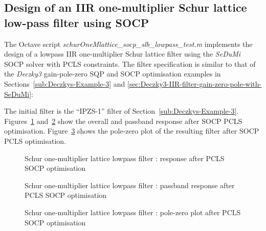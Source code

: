 \documentclass[a4paper,twoside,10pt,english]{report}
\begin{document}
\subsection{Design of an IIR one-multiplier Schur lattice low-pass filter using SOCP}
The Octave script \emph{schurOneMlattice\_socp\_slb\_lowpass\_test.m} implements
the design of a lowpass IIR one-multiplier Schur lattice filter using the 
\emph{SeDuMi} SOCP solver with PCLS constraints. The filter specification is 
similar to that of the \emph{Deczky3} gain-pole-zero SQP and SOCP optimisation
examples in Sections~\ref{sub:Deczkys-Example-3} and
\ref{sec:Deczky3-IIR-filter-gain-zero-pole-with-SeDuMi}:
\begin{small}

\end{small}
The initial filter is the ``IPZS-1'' filter of 
Section~\ref{sub:Deczkys-Example-3}. 
Figures~\ref{fig:Schur-one-multiplier-lattice-lowpass-filter-SOCP-PCLS} 
and~\ref{fig:Schur-one-multiplier-lattice-lowpass-filter-SOCP-PCLS-pass} 
show the overall and passband response after SOCP PCLS optimisation.
Figure~\ref{fig:Schur-one-multiplier-lattice-lowpass-filter-SOCP-PCLS-pz} shows
the pole-zero plot of the resulting filter after SOCP PCLS optimisation.

\begin{figure}[!htbp]
\begin{center}
\scalebox{0.7}{}
\caption{Schur one-multiplier lattice lowpass filter : response after PCLS SOCP optimisation}
\label{fig:Schur-one-multiplier-lattice-lowpass-filter-SOCP-PCLS}
\end{center}
\end{figure}
\begin{figure}[!htbp]
\begin{center}
\scalebox{0.7}{}
\caption{Schur one-multiplier lattice lowpass filter : passband response after PCLS SOCP optimisation}
\label{fig:Schur-one-multiplier-lattice-lowpass-filter-SOCP-PCLS-pass}
\end{center}
\end{figure}
\begin{figure}[!htbp]
\begin{center}
\scalebox{0.7}{}
\caption{Schur one-multiplier lattice lowpass filter : pole-zero plot after PCLS SOCP optimisation}
\label{fig:Schur-one-multiplier-lattice-lowpass-filter-SOCP-PCLS-pz}
\end{center}
\end{figure}
\end{document}
